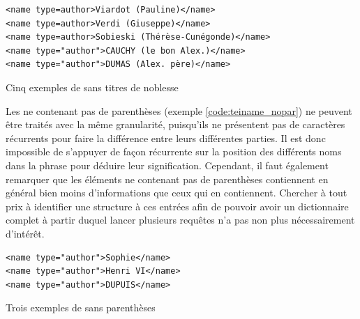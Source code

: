 \begin{listing}[h]
	\begin{verbatim}
<name type=author>Viardot (Pauline)</name>
<name type=author>Verdi (Giuseppe)</name>
<name type=author>Sobieski (Thérèse-Cunégonde)</name>
<name type="author">CAUCHY (le bon Alex.)</name>
<name type="author">DUMAS (Alex. père)</name>
	\end{verbatim}
	\caption{Cinq exemples de \tname{} sans titres de noblesse}
	\label{code:teiname_notnoble}
\end{listing}

Les \tname{} ne contenant pas de parenthèses (exemple \ref{code:teiname_nopar}) ne peuvent être traités avec la même granularité, puisqu'ils ne présentent pas de caractères récurrents pour faire la différence entre leurs différentes parties. Il est donc impossible de s'appuyer de façon récurrente sur la position des différents noms dans la phrase pour déduire leur signification. Cependant, il faut également remarquer que les éléments ne contenant pas de parenthèses contiennent en général bien moins d'informations que ceux qui en contiennent. Chercher à tout prix à identifier une structure à ces entrées afin de pouvoir avoir un \gls{dictionnaire} complet à partir duquel lancer plusieurs requêtes n'a pas non plus nécessairement d'intérêt.

\begin{listing}[h]
	\begin{verbatim}
<name type="author">Sophie</name>
<name type="author">Henri VI</name>
<name type="author">DUPUIS</name>
	\end{verbatim}
	\caption{Trois exemples de \tname{} sans parenthèses}
	\label{code:teiname_nopar}
\end{listing}

